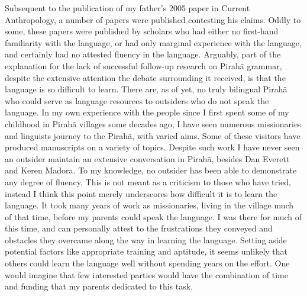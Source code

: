 \documentclass[output=paper,colorlinks,citecolor=brown
]{langscibook}
\begin{document}
    Subsequent to the publication of my father’s 2005 paper in Current Anthropology, a number of papers were published contesting his claims. Oddly to some, these papers were published by scholars who had either no first-hand familiarity with the language, or had only marginal experience with the language, and certainly had no attested fluency in the language. Arguably, part of the explanation for the lack of successful follow-up research on Pirahã grammar, despite the extensive attention the debate surrounding it received, is that the language is so difficult to learn. There are, as of yet, no truly bilingual Pirahã who could serve as language resources to outsiders who do not speak the language. In my own experience with the people since I first spent some of my childhood in Pirahã villages some decades ago, I have seen numerous missionaries and linguists journey to the Pirahã, with varied aims. Some of these visitors have produced manuscripts on a variety of topics. Despite such work I have never seen an outsider maintain an extensive conversation in Pirahã, besides Dan Everett and Keren Madora. To my knowledge, no outsider has been able to demonstrate any degree of fluency. This is not meant as a criticism to those who have tried, instead I think this point merely underscores how difficult it is to learn the language. It took many years of work as missionaries, living in the village much of that time, before my parents could speak the language. I was there for much of this time, and can personally attest to the frustrations they conveyed and obstacles they overcame along the way in learning the language. Setting aside potential factors like appropriate training and aptitude, it seems unlikely that others could learn the language well without spending years on the effort. One would imagine that few interested parties would have the combination of time and funding that my parents dedicated to this task.
    
\end{document}
